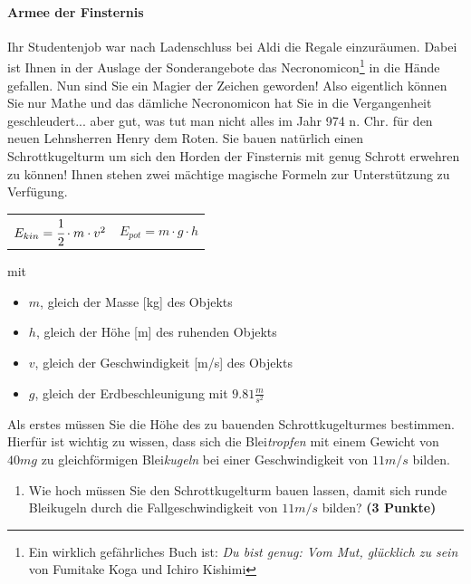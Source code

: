\documentclass[a4paper, 9pt]{scrartcl}\usepackage[]{graphicx}\usepackage[]{xcolor}
\begin{document}
\paragraph{Armee der Finsternis}



Ihr Studentenjob war nach Ladenschluss bei Aldi die Regale
einzur{\"a}umen. Dabei ist Ihnen in der Auslage der Sonderangebote das
Necronomicon\footnote{Ein wirklich gef{\"a}hrliches Buch ist:
  \textit{Du bist genug: Vom Mut, gl{\"u}cklich zu sein} von Fumitake Koga und
  Ichiro Kishimi} in die H{\"a}nde gefallen. Nun sind Sie ein Magier der
Zeichen geworden! Also eigentlich k{\"o}nnen Sie nur Mathe und das d{\"a}mliche
Necronomicon hat Sie in die Vergangenheit geschleudert... aber gut, was tut
man nicht alles im Jahr 974 n. Chr. f{\"u}r den neuen Lehnsherren
Henry dem Roten. Sie bauen nat{\"u}rlich einen Schrottkugelturm um sich den
Horden der Finsternis mit genug Schrott erwehren zu k{\"o}nnen! Ihnen stehen
zwei m{\"a}chtige magische Formeln zur Unterst{\"u}tzung zu Verf{\"u}gung.

\begin{center}
  \begin{tabular}{cc}
    $E_{kin} = \cfrac{1}{2}\cdot m \cdot v^2$ & $E_{pot} = m \cdot g \cdot h$\\
  \end{tabular}
\end{center}

mit

\begin{itemize}
\item $m$, gleich der Masse [kg] des Objekts
\item $h$, gleich der H{\"o}he [m] des ruhenden Objekts
\item $v$, gleich der Geschwindigkeit [m/s] des Objekts
\item $g$, gleich der Erdbeschleunigung mit $9.81 \tfrac{m}{s^2}$ 
\end{itemize}

Als erstes m{\"u}ssen Sie die H{\"o}he des zu bauenden Schrottkugelturmes
bestimmen. Hierf{\"u}r ist wichtig zu wissen, dass sich die
Blei\textit{tropfen} mit einem Gewicht von $40mg$ zu
gleichf{\"o}rmigen Blei\textit{kugeln} bei einer Geschwindigkeit von
$11m/s$ bilden.

\begin{enumerate}
\item Wie hoch m{\"u}ssen Sie den Schrottkugelturm bauen lassen, damit sich
  runde Bleikugeln durch die Fallgeschwindigkeit von $11m/s$ bilden?
  \textbf{(3 Punkte)}
\end{enumerate}
\end{document}
